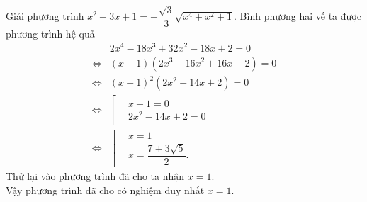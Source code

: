 \begin{bt}%
	Giải phương trình $x^2 - 3x + 1 = -\dfrac{\sqrt{3}}{3} \sqrt{x^4 + x^2 + 1}$.
	\loigiai
	{
		Bình phương hai vế ta được phương trình hệ quả
		\begin{align*}
		& 2x^4 - 18x^3 + 32x^2 - 18x + 2 = 0 \\
		\Leftrightarrow & (x - 1)(2x^3 - 16x^2 + 16x - 2) = 0 \\
		\Leftrightarrow & (x - 1)^2(2x^2 - 14x + 2) = 0 \\
		\Leftrightarrow & \left[\begin{aligned} & x - 1 = 0 \\& 2x^2 - 14x + 2 = 0 \end{aligned}\right. \\
		\Leftrightarrow & \left[\begin{aligned} & x = 1 \\& x = \dfrac{7 \pm 3\sqrt{5}}{2}. \end{aligned}\right.
		\end{align*}
		Thử lại vào phương trình đã cho ta nhận $x = 1$.\\
		Vậy phương trình đã cho có nghiệm duy nhất $x = 1$.
	}
\end{bt}


